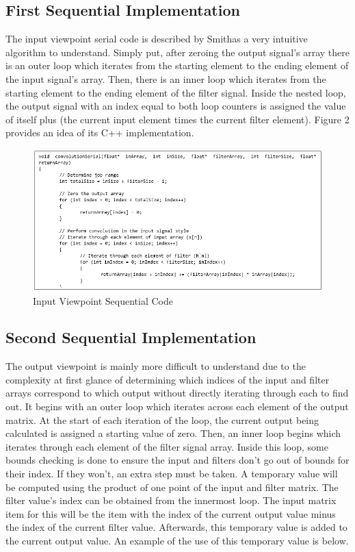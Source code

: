 \documentclass{article}
\begin{document}
\subsection{First Sequential Implementation}
The input viewpoint serial code is described by Smith as a very intuitive algorithm to understand. Simply put, after zeroing the output signal’s array there is an outer loop which iterates from the starting element to the ending element of the input signal’s array. Then, there is an inner loop which iterates from the starting element to the ending element of the filter signal. Inside the nested loop, the output signal with an index equal to both loop counters is assigned the value of itself plus (the current input element times the current filter element). Figure 2 provides an idea of its C++ implementation.

\begin{figure}[htp]
    \centering
    \includegraphics[width=\textwidth]{1048_2.png}
    \caption{Input Viewpoint Sequential Code}
    \label{fig:inpoint view code}
\end{figure}

\subsection{Second Sequential Implementation}
The output viewpoint is mainly more difficult to understand due to the complexity at first glance of determining which indices of the input and filter arrays correspond to which output without directly iterating through each to find out. It begins with an outer loop which iterates across each element of the output matrix. At the start of each iteration of the loop, the current output being calculated is assigned a starting value of zero. Then, an inner loop begins which iterates through each element of the filter signal array. Inside this loop, some bounds checking is done to ensure the input and filters don’t go out of bounds for their index. If they won’t, an extra step must be taken. A temporary value will be computed using the product of one point of the input and filter matrix. The filter value’s index can be obtained from the innermost loop. The input matrix item for this will be the item with the index of the current output value minus the index of the current filter value. Afterwards, this temporary value is added to the current output value. An example of the use of this temporary value is below.
\end{document}
